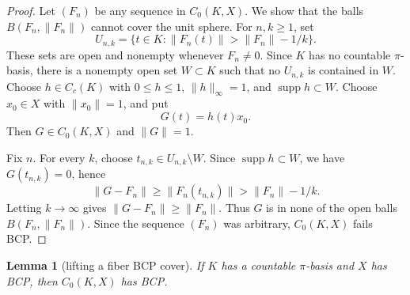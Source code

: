 \documentclass[11pt]{article}
\newtheorem{lemma}{Lemma}
\newcommand{\supp}{\operatorname{supp}}
\begin{document}
\begin{proof}
Let \((F_n)\) be any sequence in \(C_0(K,X)\).  We show that the balls
\(B(F_n,\|F_n\|)\) cannot cover the unit sphere.  For \(n,k\ge1\), set
\[
        U_{n,k}=\{t\in K:\|F_n(t)\|>\|F_n\|-1/k\}.
\]
These sets are open and nonempty whenever \(F_n\ne0\).  Since \(K\) has no
countable \(\pi\)-basis, there is a nonempty open set \(W\subset K\) such that
no \(U_{n,k}\) is contained in \(W\).  Choose \(h\in C_c(K)\) with
\(0\le h\le1\), \(\|h\|_\infty=1\), and \(\supp h\subset W\).  Choose
\(x_0\in X\) with \(\|x_0\|=1\), and put
\[
        G(t)=h(t)x_0 .
\]
Then \(G\in C_0(K,X)\) and \(\|G\|=1\).

Fix \(n\).  For every \(k\), choose \(t_{n,k}\in U_{n,k}\setminus W\).  Since
\(\supp h\subset W\), we have \(G(t_{n,k})=0\), hence
\[
        \|G-F_n\|
        \ge \|F_n(t_{n,k})\|
        > \|F_n\|-1/k .
\]
Letting \(k\to\infty\) gives \(\|G-F_n\|\ge\|F_n\|\).  Thus \(G\) is in none of
the open balls \(B(F_n,\|F_n\|)\).  Since the sequence \((F_n)\) was arbitrary,
\(C_0(K,X)\) fails BCP.
\end{proof}

\begin{lemma}[lifting a fiber BCP cover]
\label{lem:positive-bcp}
If \(K\) has a countable \(\pi\)-basis and \(X\) has BCP, then \(C_0(K,X)\)
has BCP.
\end{lemma}
\end{document}
